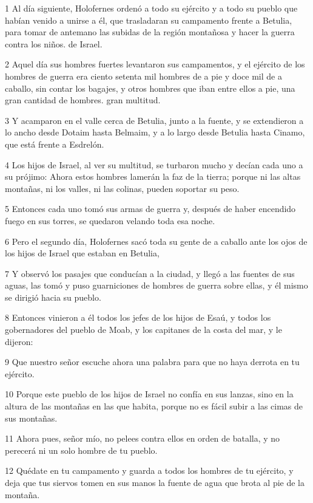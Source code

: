 \par 1 Al día siguiente, Holofernes ordenó a todo su ejército y a todo su pueblo que habían venido a unirse a él, que trasladaran su campamento frente a Betulia, para tomar de antemano las subidas de la región montañosa y hacer la guerra contra los niños. de Israel.
\par 2 Aquel día sus hombres fuertes levantaron sus campamentos, y el ejército de los hombres de guerra era ciento setenta mil hombres de a pie y doce mil de a caballo, sin contar los bagajes, y otros hombres que iban entre ellos a pie, una gran cantidad de hombres. gran multitud.
\par 3 Y acamparon en el valle cerca de Betulia, junto a la fuente, y se extendieron a lo ancho desde Dotaim hasta Belmaim, y a lo largo desde Betulia hasta Cinamo, que está frente a Esdrelón.
\par 4 Los hijos de Israel, al ver su multitud, se turbaron mucho y decían cada uno a su prójimo: Ahora estos hombres lamerán la faz de la tierra; porque ni las altas montañas, ni los valles, ni las colinas, pueden soportar su peso.
\par 5 Entonces cada uno tomó sus armas de guerra y, después de haber encendido fuego en sus torres, se quedaron velando toda esa noche.
\par 6 Pero el segundo día, Holofernes sacó toda su gente de a caballo ante los ojos de los hijos de Israel que estaban en Betulia,
\par 7 Y observó los pasajes que conducían a la ciudad, y llegó a las fuentes de sus aguas, las tomó y puso guarniciones de hombres de guerra sobre ellas, y él mismo se dirigió hacia su pueblo.
\par 8 Entonces vinieron a él todos los jefes de los hijos de Esaú, y todos los gobernadores del pueblo de Moab, y los capitanes de la costa del mar, y le dijeron:
\par 9 Que nuestro señor escuche ahora una palabra para que no haya derrota en tu ejército.
\par 10 Porque este pueblo de los hijos de Israel no confía en sus lanzas, sino en la altura de las montañas en las que habita, porque no es fácil subir a las cimas de sus montañas.
\par 11 Ahora pues, señor mío, no pelees contra ellos en orden de batalla, y no perecerá ni un solo hombre de tu pueblo.
\par 12 Quédate en tu campamento y guarda a todos los hombres de tu ejército, y deja que tus siervos tomen en sus manos la fuente de agua que brota al pie de la montaña.

